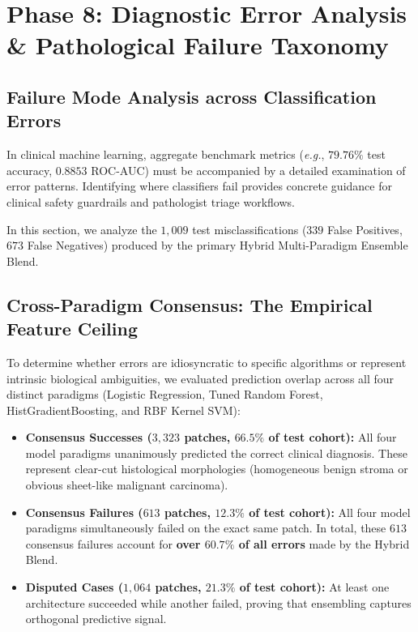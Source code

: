 \documentclass[11pt,a4paper]{article}
\begin{document}
\section{Phase 8: Diagnostic Error Analysis \& Pathological Failure Taxonomy}

\subsection{Failure Mode Analysis across Classification Errors}
In clinical machine learning, aggregate benchmark metrics (\textit{e.g.}, $79.76\%$ test accuracy, $0.8853$ ROC-AUC) must be accompanied by a detailed examination of error patterns. Identifying where classifiers fail provides concrete guidance for clinical safety guardrails and pathologist triage workflows.

In this section, we analyze the $1,009$ test misclassifications ($339$ False Positives, $673$ False Negatives) produced by the primary Hybrid Multi-Paradigm Ensemble Blend.

\subsection{Cross-Paradigm Consensus: The Empirical Feature Ceiling}
To determine whether errors are idiosyncratic to specific algorithms or represent intrinsic biological ambiguities, we evaluated prediction overlap across all four distinct paradigms (Logistic Regression, Tuned Random Forest, HistGradientBoosting, and RBF Kernel SVM):
\begin{itemize}[noitemsep]
    \item \textbf{Consensus Successes ($3,323$ patches, $66.5\%$ of test cohort):} All four model paradigms unanimously predicted the correct clinical diagnosis. These represent clear-cut histological morphologies (homogeneous benign stroma or obvious sheet-like malignant carcinoma).
    \item \textbf{Consensus Failures ($613$ patches, $12.3\%$ of test cohort):} All four model paradigms simultaneously failed on the exact same patch. In total, these $613$ consensus failures account for \textbf{over $60.7\%$ of all errors} made by the Hybrid Blend.
    \item \textbf{Disputed Cases ($1,064$ patches, $21.3\%$ of test cohort):} At least one architecture succeeded while another failed, proving that ensembling captures orthogonal predictive signal.
\end{itemize}
\end{document}
